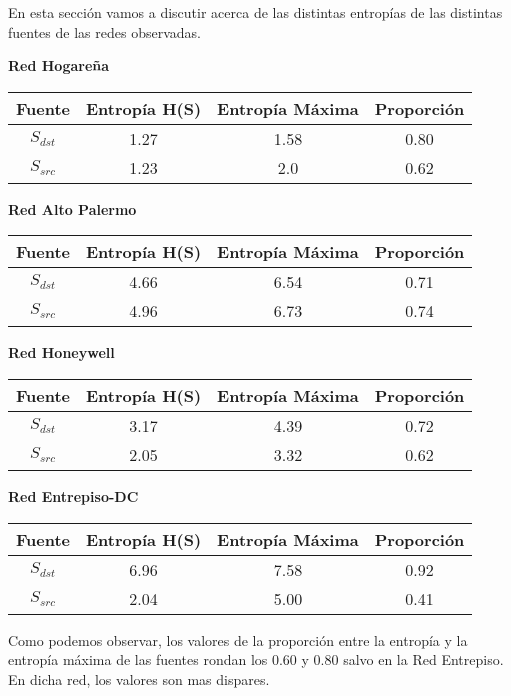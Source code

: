 En esta sección vamos a discutir acerca de las distintas entropías de las distintas fuentes de las redes observadas.

\begin{center}
\textbf{Red Hogareña}

\begin{tabular}{|c|c|c|c|}
\hline
Fuente&Entropía H(S)&Entropía Máxima&Proporción\\
\hline
$S_{dst}$&1.27&1.58&0.80\\
$S_{src}$&1.23&2.0&0.62\\ 
\hline
\end{tabular}
\end{center}

\begin{center}
\textbf{Red Alto Palermo}

\begin{tabular}{|c|c|c|c|}
\hline
Fuente&Entropía H(S)&Entropía Máxima&Proporción\\
\hline
$S_{dst}$&4.66&6.54&0.71\\
$S_{src}$&4.96&6.73&0.74\\ 
\hline
\end{tabular}
\end{center}

\begin{center}
\textbf{Red Honeywell}

\begin{tabular}{|c|c|c|c|}
\hline
Fuente&Entropía H(S)&Entropía Máxima&Proporción\\
\hline
$S_{dst}$&3.17&4.39&0.72\\
$S_{src}$&2.05&3.32&0.62\\ 
\hline
\end{tabular}
\end{center}

\begin{center}
\textbf{Red Entrepiso-DC}
 
  \begin{tabular}{|c|c|c|c|}
  \hline
  Fuente&Entropía H(S)&Entropía Máxima&Proporción\\
  \hline
  $S_{dst}$&6.96&7.58&0.92\\
  $S_{src}$&2.04&5.00&0.41\\ 
  \hline
  \end{tabular}
\end{center}

Como podemos observar, los valores de la proporción entre la entropía y la entropía máxima de las fuentes rondan los 0.60 y 0.80 salvo en la Red Entrepiso. En dicha red, los valores son mas dispares. 

